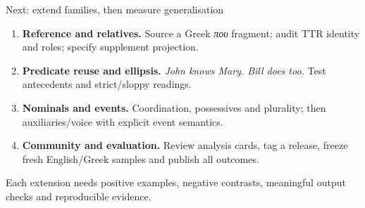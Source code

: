 \documentclass[aspectratio=169,11pt]{beamer}
\newcommand{\aside}[1]{\par{\small\color{Muted}#1}\par}
\begin{document}
\begin{frame}{Next: extend families, then measure generalisation}
  \color{Ink}
  \begin{enumerate}\setlength\itemsep{8pt}
    \item \textbf{Reference and relatives.} Source a Greek \emph{που} fragment; audit TTR identity and roles; specify supplement projection.
    \item \textbf{Predicate reuse and ellipsis.} \emph{John knows Mary. Bill does too.} Test antecedents and strict/sloppy readings.
    \item \textbf{Nominals and events.} Coordination, possessives and plurality; then auxiliaries/voice with explicit event semantics.
    \item \textbf{Community and evaluation.} Review analysis cards, tag a release, freeze fresh English/Greek samples and publish all outcomes.
  \end{enumerate}
  \vspace{2mm}\aside{Each extension needs positive examples, negative contrasts, meaningful output checks and reproducible evidence.}
\end{frame}
\end{document}
